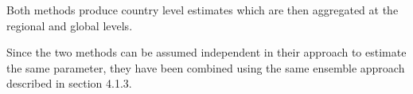 Both methods produce country level estimates which are then aggregated at the regional and global levels.

Since the two methods can be assumed independent in their approach to estimate the same parameter, they have been combined using the same ensemble approach described in section 4.1.3.%

